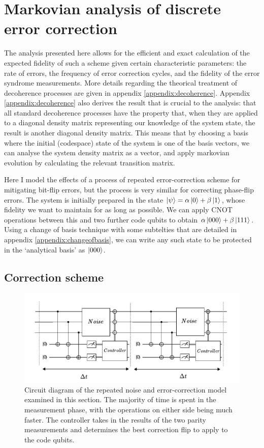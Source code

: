 \documentclass{report}
\begin{document}
\section{Markovian analysis of discrete error correction}
The analysis presented here allows for the efficient and exact calculation of the expected fidelity of such a scheme given certain characteristic parameters: the rate of errors, the frequency of error correction cycles, and the fidelity of the error syndrome measurements.
More details regarding the theorical treatment of decoherence processes are given in appendix \ref{appendix:decoherence}. Appendix \ref{appendix:decoherence} also derives the result that is crucial to the analysis: that all standard decoherence processes have the property that, when they are applied to a diagonal density matrix representing our knowledge of the system state, the result is another diagonal density matrix. This means that by choosing a basis where the initial (codespace) state of the system is one of the basis vectors, we can analyse the system density matrix as a vector, and apply markovian evolution by calculating the relevant transition matrix. 

Here I model the effects of a process of repeated error-correction scheme for mitigating bit-flip errors, but the process is very similar for correcting phase-flip errors. The system is initially prepared in the state $\ket{\psi} = \alpha \ket{0} + \beta \ket{1}$, whose fidelity we want to maintain for as long as possible. We can apply CNOT operations between this and two further code qubits to obtain $\alpha \ket{000} + \beta \ket{111}$. Using a change of basis technique with some subtelties that are detailed in appendix \ref{appendix:changeofbasis}, we can write any such state to be protected in the `analytical basis' as $\ket{000}$.

\subsection{Correction scheme}
\begin{figure}[ht]
    \centering
    \includegraphics[scale = 0.9]{Figures/Circuit/diagram.pdf}
    \caption{Circuit diagram of the repeated noise and error-correction model examined in this section. The majority of time is spent in the measurement phase, with the operations on either side being much faster. The controller takes in the results of the two parity measurements and determines the best correction flip to apply to the code qubits.}
    \label{fig:circuitdiagram}
\end{figure}
    
\end{document}
